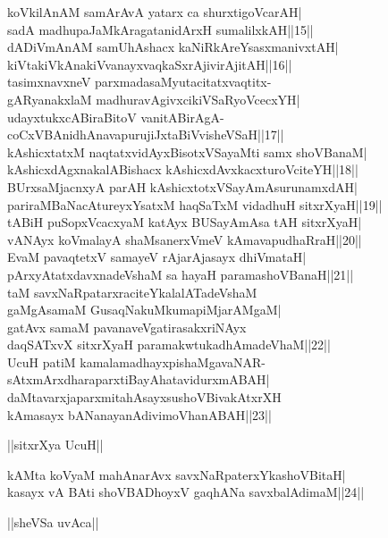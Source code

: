 \documentclass{article}
\begin{document}
koVkilAnAM samArAvA yatarx ca shurxtigoVcarAH|\\
sadA madhupaJaMkAragatanidArxH sumalilxkAH||15||\\
dADiVmAnAM samUhAshacx kaNiRkAreYsasxmanivxtAH|\\
kiVtakiVkAnakiVvanayxvaqkaSxrAjivirAjitAH||16||\\
tasimxnavxneV parxmadasaMyutacitatxvaqtitx-\\
gARyanakxlaM madhuravAgivxcikiVSaRyoVcecxYH|\\
udayxtukxcABiraBitoV vanitABirAgA-\\
coCxVBAnidhAnavapurujiJxtaBiVvisheVSaH||17||\\
kAshicxtatxM naqtatxvidAyxBisotxVSayaMti samx shoVBanaM|\\
kAshicxdAgxnakalABishacx kAshicxdAvxkacxturoVciteYH||18||\\
BUrxsaMjacnxyA parAH kAshicxtotxVSayAmAsurunamxdAH|\\
pariraMBaNacAtureyxYsatxM haqSaTxM vidadhuH sitxrXyaH||19||\\
tABiH puSopxVcacxyaM katAyx BUSayAmAsa tAH sitxrXyaH|\\
vANAyx koVmalayA shaMsanerxVmeV kAmavapudhaRraH||20||\\
EvaM pavaqtetxV samayeV rAjarAjasayx dhiVmataH|\\
pArxyAtatxdavxnadeVshaM sa hayaH paramashoVBanaH||21||\\
taM savxNaRpatarxraciteYkalalATadeVshaM\\
gaMgAsamaM GusaqNakuMkumapiMjarAMgaM|\\
gatAvx samaM pavanaveVgatirasakxriNAyx\\
daqSATxvX sitxrXyaH paramakwtukadhAmadeVhaM||22||\\
UcuH patiM kamalamadhayxpishaMgavaNAR-\\
sAtxmArxdharaparxtiBayAhatavidurxmABAH|\\
daMtavarxjaparxmitahAsayxsushoVBivakAtxrXH\\
kAmasayx bANanayanAdivimoVhanABAH||23||\\

\begin{center}
||sitxrXya UcuH||
\end{center}

kAMta koVyaM mahAnarAvx savxNaRpaterxYkashoVBitaH|\\
kasayx vA BAti shoVBADhoyxV gaqhANa savxbalAdimaM||24||\\

\begin{center}
||sheVSa uvAca||
\end{center}
\end{document}
